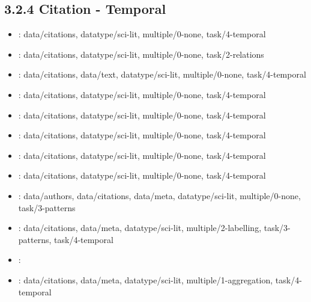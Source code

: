\begin {refsection}
\section [3.2.4 Citation - Temporal] {3.2.4 Citation - Temporal}

\begin {itemize}
\item \cite {abello-2014-a-modular-degree-of-interest-specification-for-the-visual-analysis}:
    data/citations, datatype/sci-lit, multiple/0-none, task/4-temporal


\item \cite {garfield-2004-historiographic-mapping-of-knowledge-domains-literature}:
    data/citations, datatype/sci-lit, multiple/0-none, task/2-relations


\item \cite {chen-2007-delineating-the-citation-impact-of-scientific-discoveries}:
    data/citations, data/text, datatype/sci-lit, multiple/0-none, task/4-temporal


\item \cite {shibata-2008-detecting-emerging-research-fronts-based}:
    data/citations, datatype/sci-lit, multiple/0-none, task/4-temporal


\item \cite {matejka-2012-citeology:-visualizing-paper-genealogy}:
    data/citations, datatype/sci-lit, multiple/0-none, task/4-temporal


\item \cite {chen-2004-searching-for-intellectual-turning-points:-progressive}:
    data/citations, datatype/sci-lit, multiple/0-none, task/4-temporal


\item \cite {chen-2003-the-rising-landscape:-a-visual-exploration-of-superstring}:
    data/citations, datatype/sci-lit, multiple/0-none, task/4-temporal


\item \cite {rosvall-2010-mapping-change-in-large-networks}:
    data/citations, datatype/sci-lit, multiple/0-none, task/4-temporal


\item \cite {erten-2004-graphael:-graph-animations-with-evolving}:
    data/authors, data/citations, data/meta, datatype/sci-lit, multiple/0-none, task/3-patterns


\item \cite {chen-2006-citespace-ii:-detecting-and-visualizing-emerging-trends}:
    data/citations, data/meta, datatype/sci-lit, multiple/2-labelling, task/3-patterns, task/4-temporal


\item \cite {small-1977-a-co-citation-model-of-a-scientific-specialty:-a-longitudinal}:
    


\item \cite {herr-ii-2008-113-years-of-physical-review:-using-flow}:
    data/citations, data/meta, datatype/sci-lit, multiple/1-aggregation, task/4-temporal


\end {itemize}
\printbibliography
\end {refsection}\pagebreak

